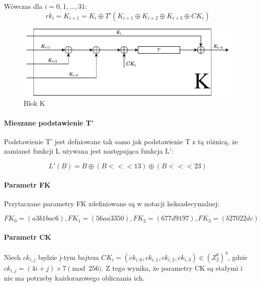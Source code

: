  Wówczas dla $i = 0, 1, \ldots, 31$:
\begin{equation*}
    rk_i = K_{i+1} = K_i \oplus T'(K_{i+1} \oplus K_{i+2} \oplus K_{i+3} \oplus CK_i)
\end{equation*}

\begin{figure}[H]
  \centering
  \includegraphics{diagramy/K.pdf}
  \caption{Blok K}
  \label{fig:K}
\end{figure}

\paragraph{Mieszane podstawienie T'}\mbox{}

Podstawienie T' jest defniowane tak samo jak podstawienie T z tą różnicą, że zamianst funkcji L używana jest następująca funkcja L':

\begin{equation*}
    L'(B) = B \oplus (B <<< 13) \oplus (B <<< 23)
\end{equation*}

\paragraph{Parametr FK}\mbox{}

Przytaczane parametry FK zdefiniowane są w notacji heksadecymalnej:

\begin{equation*}
    FK_0 = (a3b1bac6), FK_1 =  (56aa3350), FK_2 = (677d9197), FK_3 = (b27022dc)
\end{equation*}

\paragraph{Parametr CK}\mbox{}

Niech $ck_{i,j}$ będzie j-tym bajtem $CK_i = (ck_{i,0}, ck_{i,1}, ck_{i,2}, ck_{i,3}) \in (Z^8_2)^4$, gdzie $ck_{i,j} = (4i + j) \times 7 \pmod{256}$. Z tego wynika, że parametry CK są stałymi i nie ma potrzeby każdorazowego obliczania ich.








